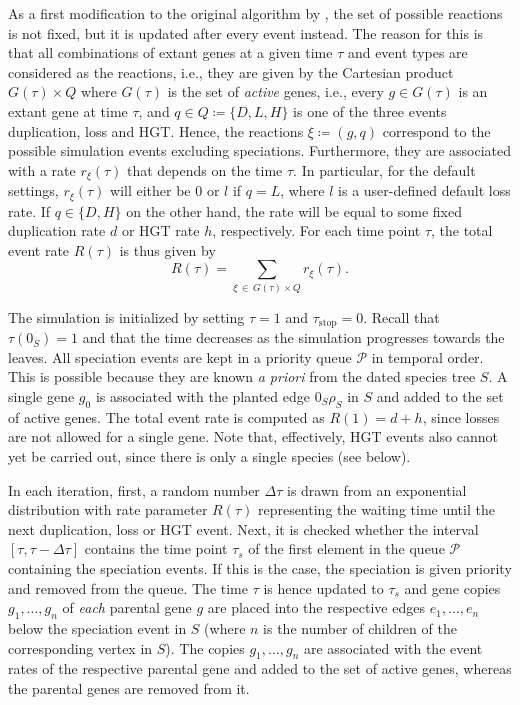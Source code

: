 \documentclass[hidelinks,11pt]{scrreprt}
\begin{document}
As a first modification to the original algorithm by \citet{gillespie1976}, the set of possible reactions is not fixed, but it is updated after every event instead. The reason for this is that all combinations of extant genes at a given time $\tau$ and event types are considered as the reactions, i.e., they are given by the Cartesian product $G(\tau) \times Q$ where $G(\tau)$ is the set of \emph{active} genes, i.e., every $g\in G(\tau)$ is an extant gene at time $\tau$, and $q\in Q\coloneqq\{D,L,H\}$ is one of the three events duplication, loss and HGT.
Hence, the reactions $\xi \coloneqq (g,q)$ correspond to the possible simulation events excluding speciations. Furthermore, they are associated with a rate $r_{\xi}(\tau)$ that depends on the time $\tau$. In particular, for the default settings, $r_{\xi}(\tau)$ will either be $0$ or $l$ if $q=L$, where $l$ is a user-defined default loss rate. If $q\in\{D,H\}$ on the other hand, the rate will be equal to some fixed duplication rate $d$ or HGT rate $h$, respectively. For each time point $\tau$, the total event rate $R(\tau)$ is thus given by
\begin{equation}
R(\tau) = \sum_{\xi \,\in\, G(\tau) \times Q} r_{\xi}(\tau).
\end{equation}

The simulation is initialized by setting $\tau=1$ and $\tau_{\textrm{stop}}=0$. Recall that $\tau(0_S)=1$ and that the time decreases as the simulation progresses towards the leaves. All speciation events are kept in a priority queue $\mathcal{P}$ in temporal order. This is possible because they are known \textit{a priori} from the dated species tree $S$. A single gene $g_{0}$ is associated with the planted edge $0_S\rho_S$ in $S$ and added to the set of active genes.
The total event rate is computed as $R(1) = d+h$, since losses are not allowed for a single gene. Note that, effectively, HGT events also cannot yet be carried out, since there is only a single species (see below).

In each iteration, first, a random number $\Delta\tau$ is drawn from an exponential distribution with rate parameter $R(\tau)$ representing the waiting time until the next duplication, loss or HGT event.
Next, it is checked whether the interval $[\tau, \tau - \Delta\tau]$ contains the time point $\tau_s$ of the first element in the queue $\mathcal{P}$ containing the speciation events. If this is the case, the speciation is given priority and removed from the queue. The time $\tau$ is hence updated to $\tau_s$ and gene copies $g_1,...,g_n$ of \emph{each} parental gene $g$ are placed into the respective edges $e_1,...,e_n$ below the speciation event in $S$ (where $n$ is the number of children of the corresponding vertex in $S$). The copies $g_1,...,g_n$ are associated with the event rates of the respective parental gene and added to the set of active genes, whereas the parental genes are removed from it.
\end{document}
